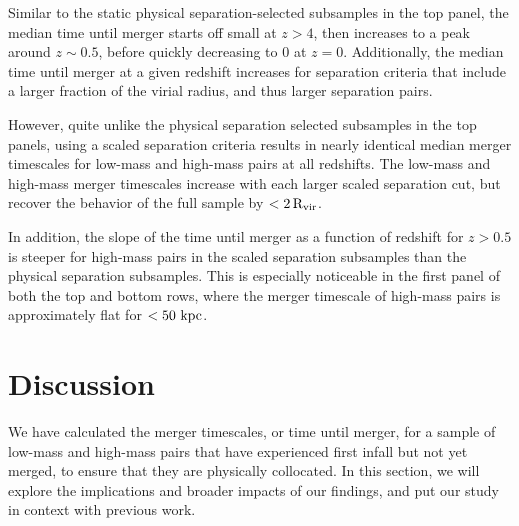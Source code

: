 \documentclass[twocolumn,linenumbers]{aastex631}
\begin{document}
        Similar to the static physical separation-selected subsamples in the top panel, the median time until merger starts off small at $z>4$, then increases to a peak around $z\sim0.5$, before quickly decreasing to 0 at $z=0$. 
        Additionally, the median time until merger at a given redshift increases for separation criteria that include a larger fraction of the virial radius, and thus larger separation pairs. 
        
        However, quite unlike the physical separation selected subsamples in the top panels, using a scaled separation criteria results in nearly identical median merger timescales for low-mass and high-mass pairs at all redshifts.
        The low-mass and high-mass merger timescales increase with each larger scaled separation cut, but recover the behavior of the full sample by $<2\,\rm R_{vir}$.
        
        In addition, the slope of the time until merger as a function of redshift for $z>0.5$ is steeper for high-mass pairs in the scaled separation subsamples than the physical separation subsamples.
        This is especially noticeable in the first panel of both the top and bottom rows, where the merger timescale of high-mass pairs is approximately flat for $<50\,\mathrm{\,kpc}$. 
    
    

\section{Discussion} \label{sec:discussion}
    We have calculated the merger timescales, or time until merger, for a sample of low-mass and high-mass pairs that have experienced first infall but not yet merged, to ensure that they are physically collocated.
    In this section, we will explore the implications and broader impacts of our findings, and put our study in context with previous work. 
    
\end{document}
